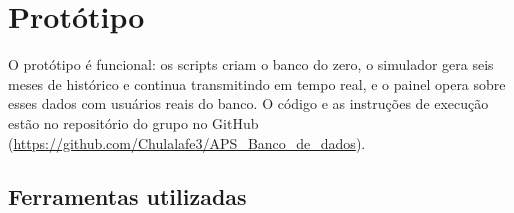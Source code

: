 \chapter{Protótipo}\label{cap:prototipo}

O protótipo é funcional: os scripts criam o banco do zero, o simulador gera seis meses de histórico e continua transmitindo em tempo real, e o painel opera sobre esses dados com usuários reais do banco. O código e as instruções de execução estão no repositório do grupo no GitHub (\url{https://github.com/Chulalafe3/APS_Banco_de_dados}).

\section{Ferramentas utilizadas}

